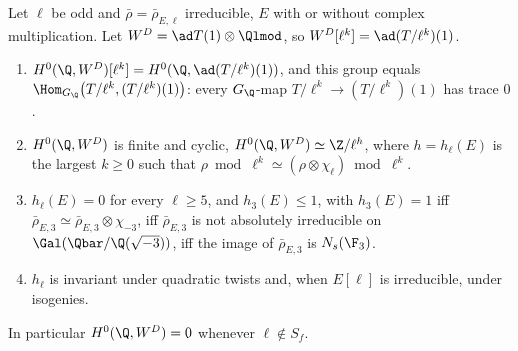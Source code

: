 \begin{lemma}\label{lem:galrep:h0}
Let $\ell$ be odd and $\bar\rho=\bar\rho_{E,\ell}$ irreducible, $E$ with or without complex multiplication. Let $W^D=\ad T(1)\otimes\Qlmod$, so $W^D[\ell^k]=\ad(T/\ell^k)(1)$.
\begin{enumerate}[label=(\roman*)]
\item $H^0(\Q,W^D)[\ell^k]=H^0(\Q,\ad(T/\ell^k)(1))$, and this group equals $\Hom_{G_\Q}\bigl(T/\ell^k,(T/\ell^k)(1)\bigr)$: every $G_\Q$-map $T/\ell^k\to(T/\ell^k)(1)$ has trace $0$.
\item $H^0(\Q,W^D)$ is finite and cyclic, $H^0(\Q,W^D)\simeq\Z/\ell^{h}$, where $h=h_\ell(E)$ is the largest $k\ge0$ such that
$\rho\bmod\ell^k\simeq(\rho\otimes\chi_\ell)\bmod\ell^k$.
\item $h_\ell(E)=0$ for every $\ell\ge5$, and $h_3(E)\le1$, with $h_3(E)=1$ iff $\bar\rho_{E,3}\simeq\bar\rho_{E,3}\otimes\chi_{-3}$, iff $\bar\rho_{E,3}$ is not absolutely irreducible on
$\Gal(\Qbar/\Q(\sqrt{-3}))$, iff the image of $\bar\rho_{E,3}$ is $N_s(\F_3)$.
\item $h_\ell$ is invariant under quadratic twists and, when $E[\ell]$ is irreducible, under isogenies.
\end{enumerate}
In particular $H^0(\Q,W^D)=0$ whenever $\ell\notin S_f$.
\end{lemma}

